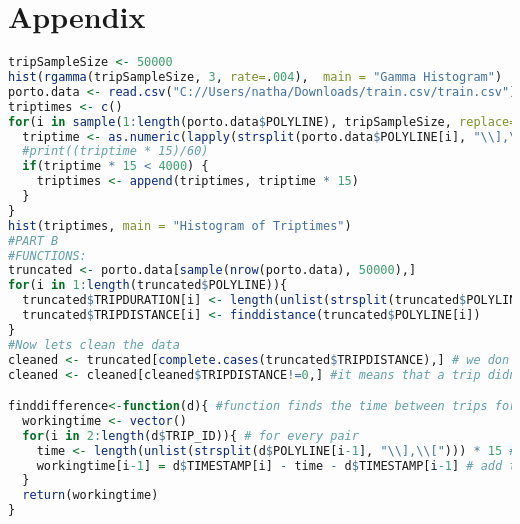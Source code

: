\documentclass{article}
\begin{document}
\section{Appendix}
\begin{lstlisting}[language=R]
tripSampleSize <- 50000
hist(rgamma(tripSampleSize, 3, rate=.004),  main = "Gamma Histogram")
porto.data <- read.csv("C://Users/natha/Downloads/train.csv/train.csv") #make sure that this is right for your computer
triptimes <- c()
for(i in sample(1:length(porto.data$POLYLINE), tripSampleSize, replace=TRUE)) {
  triptime <- as.numeric(lapply(strsplit(porto.data$POLYLINE[i], "\\],\\["), length)) 
  #print((triptime * 15)/60) 
  if(triptime * 15 < 4000) {
    triptimes <- append(triptimes, triptime * 15)
  }
}
hist(triptimes, main = "Histogram of Triptimes")
#PART B
#FUNCTIONS:
truncated <- porto.data[sample(nrow(porto.data), 50000),]
for(i in 1:length(truncated$POLYLINE)){
  truncated$TRIPDURATION[i] <- length(unlist(strsplit(truncated$POLYLINE[i], "\\],\\["))) * 15
  truncated$TRIPDISTANCE[i] <- finddistance(truncated$POLYLINE[i])
}
#Now lets clean the data
cleaned <- truncated[complete.cases(truncated$TRIPDISTANCE),] # we don't want na values, or values that are zero
cleaned <- cleaned[cleaned$TRIPDISTANCE!=0,] #it means that a trip didn't happen, or only one pair which is 15 seconds. Most likely a mistake

finddifference<-function(d){ #function finds the time between trips for all trips
  workingtime <- vector()
  for(i in 2:length(d$TRIP_ID)){ # for every pair
    time <- length(unlist(strsplit(d$POLYLINE[i-1], "\\],\\["))) * 15 # take the amount of pairs and multiply by 15
    workingtime[i-1] = d$TIMESTAMP[i] - time - d$TIMESTAMP[i-1] # add to previous time stamp, and subtract from current to find break
  }
  return(workingtime)
}


\end{lstlisting}
\end{document}
